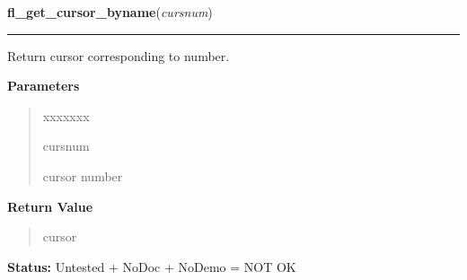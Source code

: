 \hspace{.8\funcindent}\begin{boxedminipage}{\funcwidth}

    \raggedright \textbf{fl\_get\_cursor\_byname}(\textit{cursnum})

    \vspace{-1.5ex}

    \rule{\textwidth}{0.5\fboxrule}
\setlength{\parskip}{2ex}
    Return cursor corresponding to number.

\setlength{\parskip}{1ex}
      \textbf{Parameters}
      \vspace{-1ex}

      \begin{quote}
        \begin{Ventry}{xxxxxxx}

          \item[cursnum]

          cursor number

        \end{Ventry}

      \end{quote}

      \textbf{Return Value}
    \vspace{-1ex}

      \begin{quote}
      cursor

      \end{quote}

\textbf{Status:} Untested + NoDoc + NoDemo = NOT OK



    \end{boxedminipage}

    \label{xformslib:library:fl_reset_cursor}

    \vspace{0.5ex}

